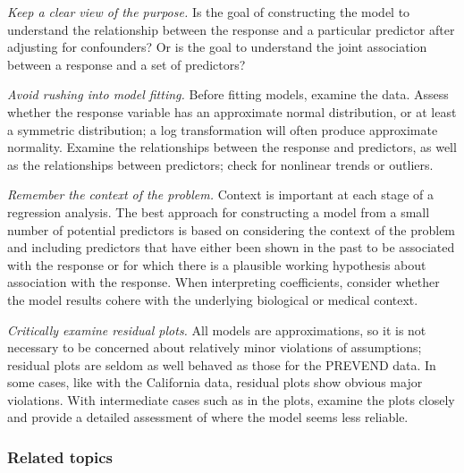 \begin{description}

	\item \emph{Keep a clear view of the purpose.} Is the goal of constructing the model to understand the relationship between the response and a particular predictor after adjusting for confounders? Or is the goal to understand the joint association between a response and a set of predictors? 
	
	\item \emph{Avoid rushing into model fitting.} Before fitting models, examine the data. Assess whether the response variable has an approximate normal distribution, or at least a symmetric distribution; a log transformation will often produce approximate normality. Examine the relationships between the response and predictors, as well as the relationships between predictors; check for nonlinear trends or outliers. 
	
	\item \emph{Remember the context of the problem.} Context is important at each stage of a regression analysis. The best approach for constructing a model from a small number of potential predictors is based on considering the context of the problem and including predictors that have either been shown in the past to be associated with the response or for which there is a plausible working hypothesis about association with the response. When interpreting coefficients, consider whether the model results cohere with the underlying biological or medical context.
	
	\item \emph{Critically examine residual plots.} All models are approximations, so it is not necessary to be concerned about relatively minor violations of assumptions; residual plots are seldom as well behaved as those for the PREVEND data. In some cases, like with the California data, residual plots show obvious major violations. With intermediate cases such as in the  plots, examine the plots closely and provide a detailed assessment of where the model seems less reliable.

\end{description}

\subsubsection{Related topics}

